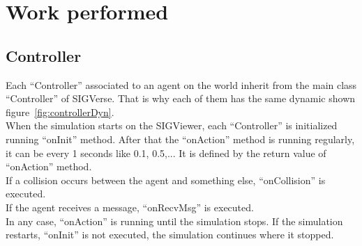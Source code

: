 \chapter{Work performed}
\setlength{\parskip}{2.5ex plus .4ex minus .4ex}
\section{Controller}\label{sec:controller}
Each ``Controller'' associated to an agent on the world inherit from the main class ``Controller'' of SIGVerse. That is why each of them has the same dynamic shown figure~\ref{fig:controllerDyn}.\\

When the simulation starts on the SIGViewer, each ``Controller'' is initialized running ``onInit'' method. After that the ``onAction'' method is running regularly, it can be every 1 seconds like 0.1, 0.5,... It is defined by the return value of ``onAction'' method.\\
If a collision occurs between the agent and something else, ``onCollision'' is executed.\\
If the agent receives a message, ``onRecvMsg'' is executed.\\

In any case, ``onAction'' is running until the simulation stops. If the simulation restarts, ``onInit'' is not executed, the simulation continues where it stopped.\\

\noindent\begin{minipage}{\linewidth}%
\label{fig:controllerDyn}%
\end{minipage}


